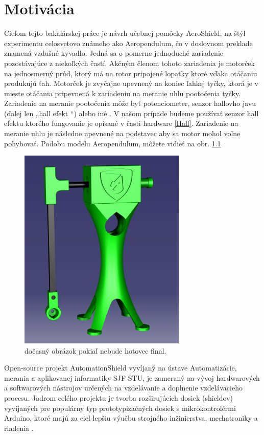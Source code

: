 \chapter{Motivácia}

Cieľom tejto bakalárskej práce je návrh učebnej pomôcky AeroShield, na štýl experimentu celosvetovo známeho ako Aeropendulum, čo v doslovnom preklade znamená vzdušné kyvadlo. Jedná sa o pomerne jednoduché zariadenie pozostávajúce z niekoľkých častí. Akčným členom tohoto zariadenia je motorček na jednosmerný prúd, ktorý má na rotor pripojené lopatky ktoré vďaka otáčaniu produkujú ťah. Motorček je zvyčajne upevnený na koniec ľahkej tyčky, ktorá je v mieste otáčania pripevnená k zariadeniu na meranie uhlu pootočenia tyčky. Zariadenie na meranie pootočenia môže byť potenciometer, senzor hallovho javu (ďalej len „hall efekt “) alebo iné \cite{senzor}. V našom prípade budeme používať senzor hall efektu ktorého fungovanie je opísané v časti hardware \ref{Hall}. Zariadenie na meranie uhlu je následne upevnené na podstavec aby sa motor mohol voľne pohybovať. Podobu modelu Aeropendulum, môžete vidieť na obr. \ref{OBRAZOK 1.1}

\begin{figure}[!tbh]
	\centering
	\includegraphics[width=80mm]{obr/pendulum.png}
	\caption{dočasný obrázok pokiaľ nebude hotovec final.}\label{OBRAZOK 1.1}
\end{figure}

Open-source projekt AutomationShield vyvíjaný na ústave Automatizácie, merania a aplikovanej informatiky SJF STU, je zameraný na vývoj hardwarových a softwarových nástrojov určených na vzdelávanie a doplnenie vzdelávacieho procesu. Jadrom celého projektu je tvorba rozširujúcich dosiek (shieldov) vyvíjaných pre populárny typ prototypizačných dosiek s mikrokontrolérmi Arduino, ktoré majú za ciel lepšiu výučbu strojného inžinierstva, mechatroniky a riadenia \cite{Auto}.

